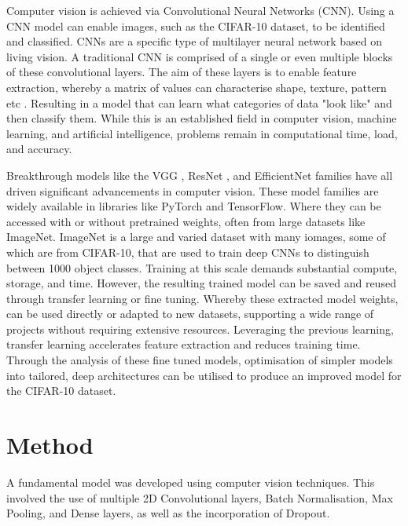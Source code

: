 \documentclass[10pt,twocolumn,letterpaper]{article}
\begin{document}
Computer vision is achieved via Convolutional Neural Networks (CNN). Using a CNN model can enable images, such as the CIFAR-10 dataset, to be identified and classified. CNNs are a specific type of multilayer neural network based on living vision. A traditional CNN is comprised of a single or even multiple blocks of these convolutional layers. The aim of these layers is to enable feature extraction, whereby a matrix of values can characterise shape, texture, pattern etc \cite{recent_trends}. Resulting in a model that can learn what categories of data "look like" and then classify them. While this is an established field in computer vision, machine learning, and artificial intelligence, problems remain in computational time, load, and accuracy. 

Breakthrough models like the VGG \cite{original_vgg}, ResNet \cite{original_resnet}, and EfficientNet \cite{original_efficientnet} families have all driven significant advancements in computer vision. These model families are widely available in libraries like PyTorch and TensorFlow. Where they can be accessed with or without pretrained weights, often from large datasets like ImageNet. ImageNet is a large and varied dataset with many iomages, some of which are from CIFAR-10, that are used to train deep CNNs to distinguish between 1000 object classes. Training at this scale demands substantial compute, storage, and time. However, the resulting trained model can be saved and reused through transfer learning or fine tuning. Whereby these extracted model weights, can be used directly or adapted to new datasets, supporting a wide range of projects without requiring extensive resources. Leveraging the previous learning, transfer learning accelerates feature extraction and reduces training time. Through the analysis of these fine tuned models, optimisation of simpler models into tailored, deep architectures can be utilised to produce an improved model for the CIFAR-10 dataset.


\section{Method}
\label{sec:method}
A fundamental model was developed using computer vision techniques. This involved the use of multiple 2D Convolutional layers, Batch Normalisation, Max Pooling, and Dense layers, as well as the incorporation of Dropout.
\end{document}
